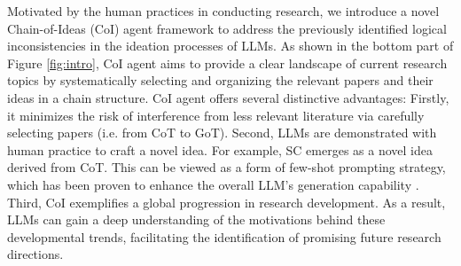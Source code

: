 \documentclass{article}
\newcommand{\orange}[1]{\textcolor{orange}{#1}}
\begin{document}
Motivated by the human practices in conducting research, we introduce a novel Chain-of-Ideas (CoI) agent framework to address the previously identified logical inconsistencies in the ideation processes of LLMs.
As shown in the bottom part of Figure \ref{fig:intro}, CoI agent aims to provide a clear landscape of current research topics by systematically selecting and organizing the relevant papers and their ideas in a chain structure.
CoI agent offers several distinctive advantages:
Firstly, it minimizes the risk of interference from less relevant literature via carefully selecting papers (i.e. from CoT \citep{wei2022chain} to GoT).
Second, LLMs are demonstrated with human practice to craft a novel idea. For example, SC \citep{wang2022self} emerges as a novel idea derived from CoT. This can be viewed as a form of few-shot prompting strategy, which has been proven to enhance the overall LLM's generation capability \citep{brown2020languagefewshot}. 
Third, CoI exemplifies a global progression in research development. As a result, LLMs can gain a deep understanding of the motivations behind these developmental trends, facilitating the identification of promising future research directions.
\end{document}
